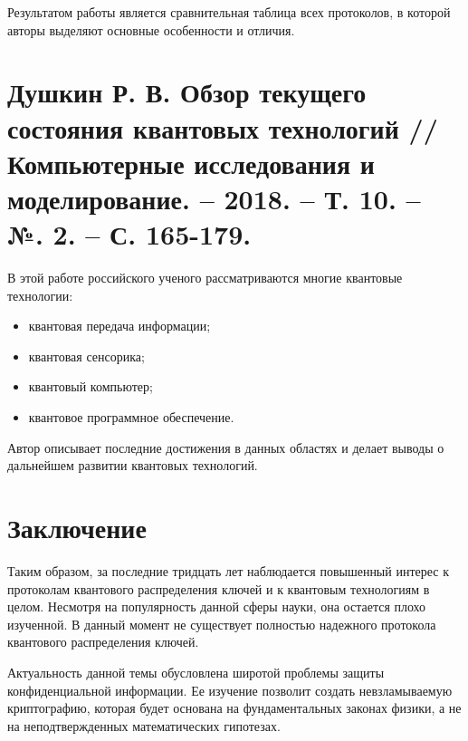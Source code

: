 Результатом работы является сравнительная таблица всех протоколов, в которой авторы выделяют основные особенности и отличия.

\section{Душкин Р. В. Обзор текущего состояния квантовых технологий //Компьютерные исследования и моделирование. – 2018. – Т. 10. – №. 2. – С. 165-179.}
В этой работе \cite{dushkin2018obzor} российского ученого рассматриваются многие квантовые технологии:
\begin{itemize}
	\item квантовая передача информации;
	\item квантовая сенсорика;
	\item квантовый компьютер;
	\item квантовое программное обеспечение.
\end{itemize}
Автор описывает последние достижения в данных областях и делает выводы о дальнейшем развитии квантовых технологий.






\clearpage

\section*{Заключение}
Таким образом, за последние тридцать лет наблюдается повышенный интерес к протоколам квантового распределения ключей и к квантовым технологиям в целом. Несмотря на популярность данной сферы науки, она остается плохо изученной. В данный момент не существует полностью надежного протокола квантового распределения ключей.

Актуальность данной темы обусловлена широтой проблемы защиты конфиденциальной информации. Ее изучение позволит создать невзламываемую криптографию, которая будет основана на фундаментальных законах физики, а не на неподтвержденных математических гипотезах.




